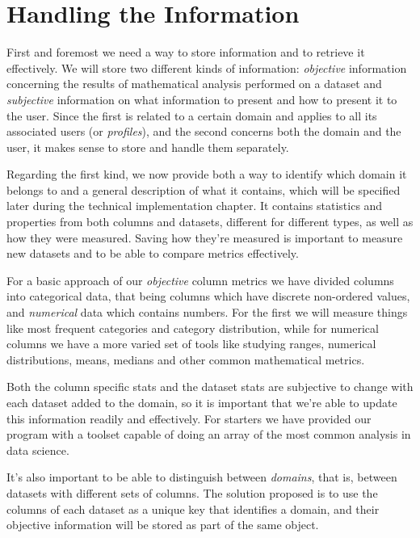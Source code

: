 \section{Handling the Information}
\label{cap2:sec:information}

First and foremost we need a way to store information and to retrieve it effectively. We will store two different kinds of information: \textit{objective} information concerning the results of mathematical analysis performed on a dataset and \textit{subjective} information on what information to present and how to present it to the user.
Since the first is related to a certain domain and applies to all its associated users (or \textit{profiles}), and the second concerns both the domain and the user, it makes sense to store and handle them separately.

Regarding the first kind, we now provide both a way to identify which domain it belongs to and a general description of what it contains, which will be specified later during the technical implementation chapter.
It contains statistics and properties from both columns and datasets, different for different types, as well as how they were measured. Saving how they're measured is important to measure new datasets and to be able to compare metrics effectively.

For a basic approach of our \textit{objective} column metrics we have divided columns into categorical data, that being columns which have discrete non-ordered values, and \textit{numerical} data which contains numbers.
For the first we will measure things like most frequent categories and category distribution, while for numerical columns we have a more varied set of tools like studying ranges, numerical distributions, means, medians and other common mathematical metrics.

Both the column specific stats and the dataset stats are subjective to change with each dataset added to the domain, so it is important that we're able to update this information readily and effectively.
For starters we have provided our program with a toolset capable of doing an array of the most common analysis in data science.

It's also important to be able to distinguish between \textit{domains}, that is, between datasets with different sets of columns. The solution proposed is to use the columns of each dataset as a unique key that identifies a domain, and their objective information will be stored as part of the same object.

